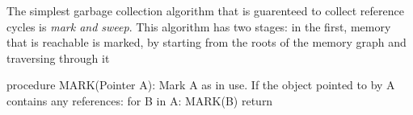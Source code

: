 \documentclass[12pt]{article}
\begin{document}
The simplest garbage collection algorithm that is guarenteed to collect reference cycles is \textit{mark and sweep}. This algorithm has two stages: in the first, 
memory that is reachable is marked, by starting from the roots of the memory graph and traversing through it 

procedure MARK(Pointer A):
	Mark A as in use. 
	If the object pointed to by A contains any references: 
	for B in A:
		MARK(B)
	return 
\end{document}
